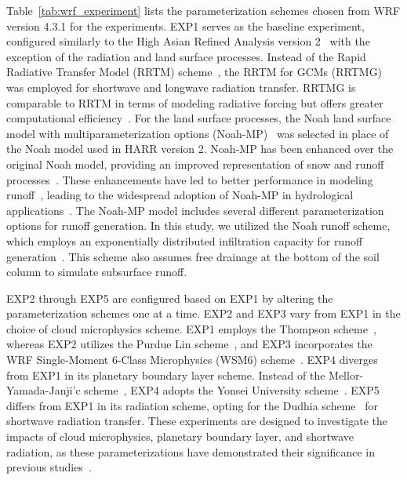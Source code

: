 \documentclass[draft]{agujournal2019}
\begin{document}
Table~\ref{tab:wrf_experiment} lists the parameterization schemes chosen from WRF version 4.3.1 for the experiments. EXP1 serves as the baseline experiment, configured similarly to the High Asian Refined Analysis version 2~\cite{wang2021IJC} with the exception of the radiation and land surface processes. Instead of the Rapid Radiative Transfer Model (RRTM) scheme~\cite{mlawer1997JGRA}, the RRTM for GCMs (RRTMG)~\cite{iacono2008JGRA} was employed for shortwave and longwave radiation transfer. RRTMG is comparable to RRTM in terms of modeling radiative forcing but offers greater computational efficiency~\cite{iacono2008JGRA}. For the land surface processes, the Noah land surface model with multiparameterization options (Noah-MP)~\cite{niu2011JGRA,yang2011JGRA} was selected in place of the Noah model used in HARR version 2. Noah-MP has been enhanced over the original Noah model, providing an improved representation of snow and runoff processes~\cite{niu2011JGRA}. These enhancements have led to better performance in modeling runoff~\cite{liang2019AAS, zheng2023ESSD}, leading to the widespread adoption of Noah-MP in hydrological applications~\cite{cosgrove2024JAWRA, lin2018JHM}. The Noah-MP model includes several different parameterization options for runoff generation. In this study, we utilized the Noah runoff scheme, which employs an exponentially distributed infiltration capacity for runoff generation~\cite{schaake1996JGRA}. This scheme also assumes free drainage at the bottom of the soil column to simulate subsurface runoff.

EXP2 through EXP5 are configured based on EXP1 by altering the parameterization schemes one at a time. EXP2 and EXP3 vary from EXP1 in the choice of cloud microphysics scheme. EXP1 employs the Thompson scheme~\cite{thompson2008MWR}, whereas EXP2 utilizes the Purdue Lin scheme~\cite{chen2002JMSJ}, and EXP3 incorporates the WRF Single-Moment 6-Class Microphysics (WSM6) scheme~\cite{hong2006APJAS}. EXP4 diverges from EXP1 in its planetary boundary layer scheme. Instead of the Mellor-Yamada-Janji'c scheme~\cite{janjic1994MWR}, EXP4 adopts the Yonsei University scheme~\cite{hong2006MWR}. EXP5 differs from EXP1 in its radiation scheme, opting for the Dudhia scheme~\cite{dudhia1989JAS} for shortwave radiation transfer. These experiments are designed to investigate the impacts of cloud microphysics, planetary boundary layer, and shortwave radiation, as these parameterizations have demonstrated their significance in previous studies~\cite{lv2020JGRA, prein2023CD}.
\end{document}
